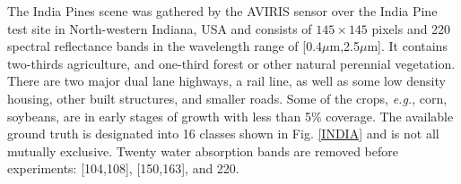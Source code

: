 The India Pines scene was gathered by the AVIRIS sensor over the India Pine test site in North-western Indiana, USA and consists of $145\times145$ pixels and 220 spectral reflectance bands in the wavelength range of [0.4$\mu$m,2.5$\mu$m]. It contains two-thirds agriculture, and one-third forest or other natural perennial vegetation. There are two major dual lane highways, a rail line, as well as some low density housing, other built structures, and smaller roads. Some of the crops, {\em e.g.}, corn, soybeans, are in early stages of growth with less than 5\% coverage. The available ground truth is designated into 16 classes shown in Fig. \ref{INDIA} and is not all mutually exclusive. Twenty water absorption bands are removed before experiments: [104,108], [150,163], and 220.

